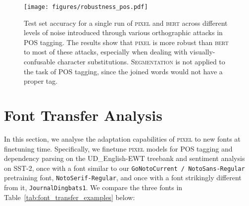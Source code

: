 \documentclass{article}
\newcommand{\model}{\textsc{pixel}\xspace}
\begin{document}
\begin{figure}[ht!]
  \centering
  \texttt{[image: figures/robustness\_pos.pdf]}\caption{Test set accuracy for a single run of \model{} and \textsc{bert} across different levels of noise introduced through various orthographic attacks in POS tagging. The results show that \model is more robust than \textsc{bert} to most of these attacks, especially when dealing with visually-confusable character substitutions. \textsc{Segmentation} is not applied to the task of POS tagging, since the joined words would not have a proper tag.}
  \label{fig:robustness_pos}
\end{figure}

\section{Font Transfer Analysis}
\label{app:font_transfer}

In this section, we analyse the adaptation capabilities of \model to new fonts at finetuning time. Specifically, we finetune \model models for POS tagging and dependency parsing on the UD\_English-EWT treebank and sentiment analysis on SST-2, once with a font similar to our  {\footnotesize \texttt{GoNotoCurrent / NotoSans-Regular}} pretraining font, {\footnotesize \texttt{NotoSerif-Regular}}, and once with a font strikingly different from it, {\footnotesize\texttt{JournalDingbats1}}. We compare the three fonts in Table~\ref{tab:font_transfer_examples} below:

\begin{table}[ht]
\centering
{}
\caption{An example sentence rendered in three different fonts.}
\label{tab:font_transfer_examples} 
\end{table}
\end{document}
